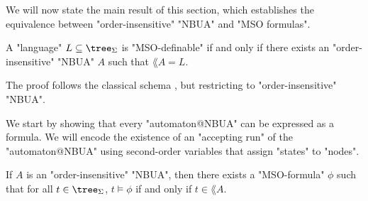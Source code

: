 \documentclass[a4paper,UKenglish,cleveref, autoref, thm-restate]{lipics-v2021}
\begin{document}
We will now state the main result of this section, which establishes the equivalence between "order-insensitive" "NBUA" and "MSO formulas".

\begin{theorem}\label{thm:MSO-NBUA}
	A "language" $L \subseteq \tree_{\Sigma}$ is "MSO-definable" if and only if there exists an "order-insensitive" "NBUA" $A$ such that $\lang A = L$.
\end{theorem}

The proof follows the classical schema \cite{Buchi60, Thomas1997, bookautomata}, but restricting to "order-insensitive" "NBUA".

We start by showing that every "automaton@NBUA" can be expressed as a formula. We will encode the existence of an "accepting run" of the "automaton@NBUA"
using second-order variables that assign "states" to "nodes".

\begin{lemma}\label{lem:Aut-to-MSO}
	If $A$ is an "order-insensitive" "NBUA", then there exists a "MSO-formula" $\phi$ such that for all $t \in \tree_{\Sigma}$, $t \models \phi$ if and only if $t \in \lang A$.
\end{lemma}
\end{document}
